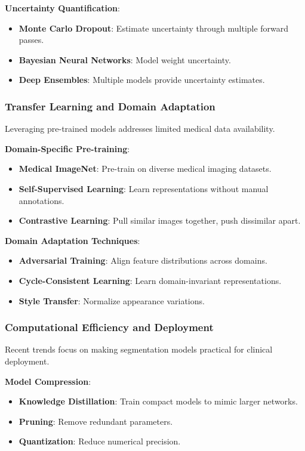 \documentclass[12pt,a4paper]{article}
\begin{document}
\textbf{Uncertainty Quantification}:
\begin{itemize}
    \item \textbf{Monte Carlo Dropout}: Estimate uncertainty through multiple forward passes.
    \item \textbf{Bayesian Neural Networks}: Model weight uncertainty.
    \item \textbf{Deep Ensembles}: Multiple models provide uncertainty estimates.
\end{itemize}

\subsubsection{Transfer Learning and Domain Adaptation}

Leveraging pre-trained models addresses limited medical data availability.

\textbf{Domain-Specific Pre-training}:
\begin{itemize}
    \item \textbf{Medical ImageNet}: Pre-train on diverse medical imaging datasets.
    \item \textbf{Self-Supervised Learning}: Learn representations without manual annotations.
    \item \textbf{Contrastive Learning}: Pull similar images together, push dissimilar apart.
\end{itemize}

\textbf{Domain Adaptation Techniques}:
\begin{itemize}
    \item \textbf{Adversarial Training}: Align feature distributions across domains.
    \item \textbf{Cycle-Consistent Learning}: Learn domain-invariant representations.
    \item \textbf{Style Transfer}: Normalize appearance variations.
\end{itemize}

\subsubsection{Computational Efficiency and Deployment}

Recent trends focus on making segmentation models practical for clinical deployment.

\textbf{Model Compression}:
\begin{itemize}
    \item \textbf{Knowledge Distillation}: Train compact models to mimic larger networks.
    \item \textbf{Pruning}: Remove redundant parameters.
    \item \textbf{Quantization}: Reduce numerical precision.
\end{itemize}
\end{document}

